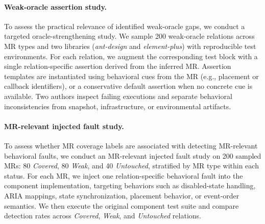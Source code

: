\paragraph{Weak-oracle assertion study.} To assess the practical relevance of identified weak-oracle gaps, we conduct a targeted oracle-strengthening study. We sample 200 weak-oracle relations across MR types and two libraries (\textit{ant-design} and \textit{element-plus}) with reproducible test environments. For each relation, we augment the corresponding test block with a single relation-specific assertion derived from the inferred MR. Assertion templates are instantiated using behavioral cues from the MR (e.g., placement or callback identifiers), or a conservative default assertion when no concrete cue is available. Two authors inspect failing executions and separate behavioral inconsistencies from snapshot, infrastructure, or environmental artifacts.

\paragraph{MR-relevant injected fault study.}
To assess whether MR coverage labels are associated with detecting MR-relevant behavioral faults, we conduct an MR-relevant injected fault study on 200 sampled MRs: 80 \textit{Covered}, 80 \textit{Weak}, and 40 \textit{Untouched}, stratified by MR type within each status.
For each MR, we inject one relation-specific behavioral fault into the component implementation, targeting behaviors such as disabled-state handling, ARIA mappings, state synchronization, placement behavior, or event-order semantics. We then execute the original component test suite and compare detection rates across \textit{Covered}, \textit{Weak}, and \textit{Untouched} relations.